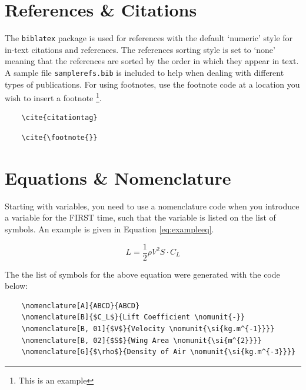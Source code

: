 \section{References \& Citations}
The \texttt{biblatex} package is used for references with the default `numeric' style for in-text citations and references. The references sorting style is set to `none' meaning that the references are sorted by the order in which they appear in text. A sample file \texttt{samplerefs.bib} is included to help when dealing with different types of publications. For using footnotes, use the footnote code at a location you wish to insert a footnote \footnote{This is an example}.

\begin{verbatim}
    \cite{citationtag}
\end{verbatim}

\begin{verbatim}
    \cite{\footnote{}}
\end{verbatim}



\section{Equations \& Nomenclature}
Starting with variables, you need to use a nomenclature code when you introduce a variable for the FIRST time, such that the variable is listed on the list of symbols. An example is given in Equation \autoref{eq:exampleeq}.

\begin{equation}
\label{eq:exampleeq}
    L = \frac{1}{2}\rho V^2 S \cdot C_{L}
\end{equation}


The the list of symbols for the above equation were generated with the code below:

\begin{verbatim}
    \nomenclature[A]{ABCD}{ABCD}
    \nomenclature[B]{$C_L$}{Lift Coefficient \nomunit{-}}
    \nomenclature[B, 01]{$V$}{Velocity \nomunit{\si{kg.m^{-1}}}}
    \nomenclature[B, 02]{$S$}{Wing Area \nomunit{\si{m^{2}}}}
    \nomenclature[G]{$\rho$}{Density of Air \nomunit{\si{kg.m^{-3}}}}
\end{verbatim}






